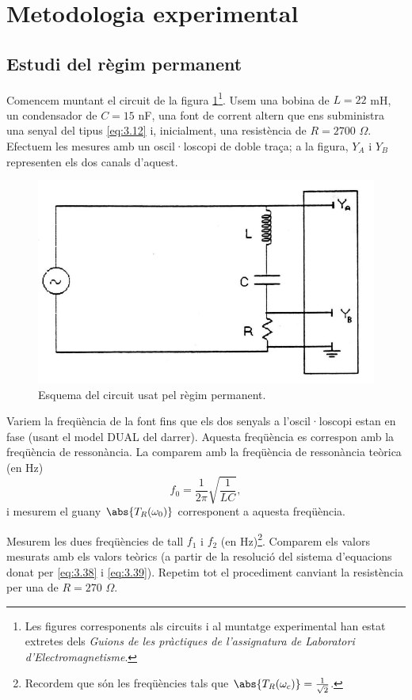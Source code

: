 \documentclass[a4paper,10.5pt]{report}
\begin{document}
\section{Metodologia experimental}

\subsection{Estudi del règim permanent}\label{expermento permanente}

Comencem muntant el circuit de la figura \ref{fig:3.2}\footnote{Les figures corresponents als circuits i al muntatge experimental han estat extretes dels \textit{Guions de les pràctiques de l'assignatura de Laboratori d'Electromagnetisme}\cite{ref3}.}. Usem una bobina de $L = 22$ mH, un condensador de $C = 15$ nF, una font de corrent altern que ens subministra una senyal del tipus \eqref{eq:3.12}  i, inicialment, una resistència de $R = 2700$ $\Omega$. Efectuem les mesures amb un oscil·loscopi de doble traça; a la figura, $Y_A$ i $Y_B$ representen els dos canals d'aquest.

\begin{figure}[h]
	\centering
	\includegraphics[width=0.3\linewidth]{screenshot005}
	\caption{Esquema del circuit usat pel règim permanent.}
	\label{fig:3.2}
\end{figure}

Variem la freqüència de la font fins que els dos senyals a l'oscil·loscopi estan en fase (usant el model DUAL del darrer). Aquesta freqüència es correspon amb la freqüència de ressonància. La comparem amb la freqüència de ressonància teòrica (en Hz)
\begin{equation}
	f_0 = \frac{1}{2\pi}\sqrt{\frac{1}{LC}}, \label{eq:3.41}
\end{equation}
i mesurem el guany $\abs{T_R(\omega_0)}$ corresponent a aquesta freqüència.

Mesurem les dues freqüències de tall $f_1$ i $f_2$ (en Hz)\footnote{Recordem que són les freqüències tals que $\abs{T_R(\omega_c)} = \frac{1}{\sqrt{2}}$.}. Comparem els valors mesurats amb els valors teòrics (a partir de la resolució del sistema d'equacions donat per \eqref{eq:3.38} i \eqref{eq:3.39}). Repetim tot el procediment canviant la resistència per una de $R = 270$ $\Omega$.
\end{document}
